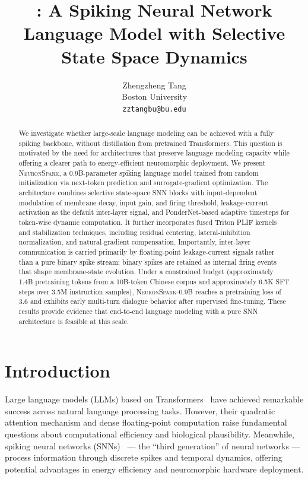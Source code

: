 \documentclass{article}
\title{\model{}: A Spiking Neural Network Language Model with Selective State Space Dynamics}
\author{
  Zhengzheng Tang \\
  Boston University \\
  \texttt{zztangbu@bu.edu}
}
\newcommand{\model}{\textsc{NeuronSpark}}
\begin{document}
\maketitle

\begin{abstract}
We investigate whether large-scale language modeling can be achieved with a fully spiking backbone, without distillation from pretrained Transformers. This question is motivated by the need for architectures that preserve language modeling capacity while offering a clearer path to energy-efficient neuromorphic deployment. We present \model{}, a 0.9B-parameter spiking language model trained from random initialization via next-token prediction and surrogate-gradient optimization. The architecture combines selective state-space SNN blocks with input-dependent modulation of membrane decay, input gain, and firing threshold, leakage-current activation as the default inter-layer signal, and PonderNet-based adaptive timesteps for token-wise dynamic computation. It further incorporates fused Triton PLIF kernels and stabilization techniques, including residual centering, lateral-inhibition normalization, and natural-gradient compensation. Importantly, inter-layer communication is carried primarily by floating-point leakage-current signals rather than a pure binary spike stream; binary spikes are retained as internal firing events that shape membrane-state evolution. Under a constrained budget (approximately 1.4B pretraining tokens from a 10B-token Chinese corpus and approximately 6.5K SFT steps over 3.5M instruction samples), \model{}-0.9B reaches a pretraining loss of 3.6 and exhibits early multi-turn dialogue behavior after supervised fine-tuning. These results provide evidence that end-to-end language modeling with a pure SNN architecture is feasible at this scale.
\end{abstract}

\section{Introduction}
\label{sec:intro}

Large language models (LLMs) based on Transformers~\citep{vaswani2017attention} have achieved remarkable success across natural language processing tasks.
However, their quadratic attention mechanism and dense floating-point computation raise fundamental questions about computational efficiency and biological plausibility.
Meanwhile, spiking neural networks (SNNs)~\citep{maass1997networks} --- the ``third generation'' of neural networks --- process information through discrete spikes and temporal dynamics, offering potential advantages in energy efficiency and neuromorphic hardware deployment.
\end{document}
